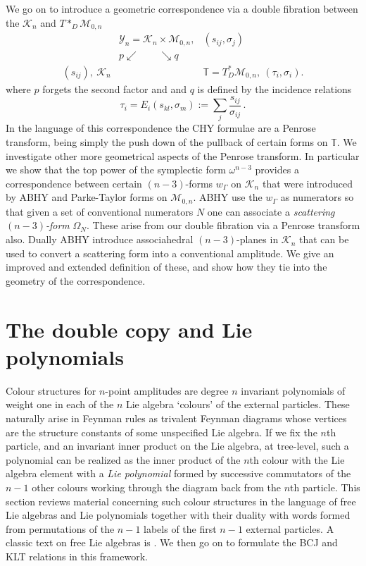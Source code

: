 \documentclass[11pt]{article}
\newcommand{\T}{\mathbb{T}}
\newcommand{\cK}{\mathcal{K}}
\newcommand{\cM}{\mathcal{M}}
\newcommand{\cY}{\mathcal{Y}}
\newcommand{\1}{{\rm 1\hskip-0.25em I}}
\begin{document}
We go on to introduce  a geometric correspondence via a double fibration  between the $\cK_n$ and $T*_D\cM_{0,n}$
\begin{eqnarray}
~& \cY_n=\cK_n\times \cM_{0,n},&(s_{ij},\sigma_j)\nonumber\\
&p\swarrow\qquad\searrow q&\nonumber\\
(s_{ij}),~ \cK_n&&\T= T^*_D \cM_{0,n}, ~ (\tau_i,\sigma_i) . 
\end{eqnarray}
where $p$ forgets the second factor and and
$q$ is defined by  the incidence relations
\begin{equation}
\tau_i =E_i(s_{kl}, \sigma_m):=\sum_j \frac{s_{ij}}{\sigma_{ij}}\, . \label{incidence}
\end{equation}
In the language of this correspondence the CHY formulae are a Penrose transform, being simply the push down of the pullback  of certain forms on $\T$.  We investigate other more geometrical aspects of the Penrose transform.   In particular we show that the top power of the symplectic form $\omega^{n-3}$ provides a correspondence between certain $(n-3)$-forms $w_\Gamma$ on $\cK_n$ that were introduced by ABHY and Parke-Taylor forms on $\cM_{0,n}$.  ABHY use the $w_\Gamma$ as numerators so that given a set of conventional numerators $N$ one can associate a \emph{scattering $(n-3)$-form} $\Omega_N$.  These arise from our double fibration via a Penrose transform also.  Dually ABHY introduce associahedral $(n-3)$-planes in $\cK_n$ that can be used to convert a scattering form into a conventional amplitude.  We give an improved and extended definition of these, and show how they tie into the geometry of the correspondence.




\section{The double copy and Lie polynomials}

Colour structures for $n$-point  amplitudes are degree $n$ invariant polynomials of weight one in each of the $n$ Lie algebra `colours' of the external particles.  These  naturally arise in Feynman rules as trivalent Feynman diagrams whose vertices are the structure constants of some unspecified Lie algebra.  If we fix the $n$th particle, and an invariant inner product on the Lie algebra, at tree-level, such a polynomial can be realized as the inner product of the $n$th colour with the Lie algebra element with a \emph{Lie polynomial} formed by successive commutators of the $n-1$ other colours working through the diagram back from the $n$th particle. This section reviews material concerning such colour structures in the language of free Lie algebras and Lie polynomials  together with their duality with words formed from permutations of the $n-1$ labels of the first $n-1$ external particles. A classic text on free Lie algebras is \cite{Reutenauer}. We then go on to formulate the BCJ and KLT relations in this framework.
\end{document}
